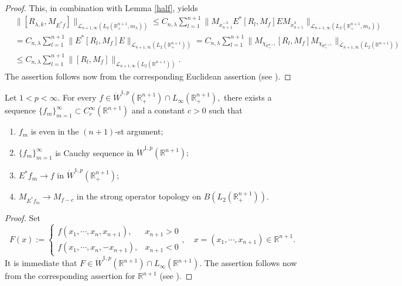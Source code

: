 \documentclass{amsart}
\begin{document}
\begin{proof}
This, in combination with Lemma \ref{half}, yields
\begin{align*}
&\|[R_{\lambda,k},M_{E^{\ast}f}]\|_{\mathcal{L}_{n+1,\infty}(L_2(\mathbb{R}^{n+1}_+,m_{\lambda}))}\leq C_{n,\lambda}\sum_{l=1}^{n+1}\Big\|M_{x_{n+1}^{-\lambda}} E^{\ast}[R_l,M_f]E M_{x_{n+1}^{\lambda}}\Big\|_{\mathcal{L}_{n+1,\infty}(L_2(\mathbb{R}^{n+1}_+,m_{\lambda}))}\\
&=C_{n,\lambda}\sum_{l=1}^{n+1}\Big\|E^{\ast}[R_l,M_f]E\Big\|_{\mathcal{L}_{n+1,\infty}(L_2(\mathbb{R}^{n+1}_+))}=C_{n,\lambda} \sum_{l=1}^{n+1}\Big\|M_{\chi_{\mathbb{R}_+^{n+1}}}[R_l,M_f]M_{\chi_{\mathbb{R}_+^{n+1}}}\Big\|_{\mathcal{L}_{n+1,\infty}(L_2(\mathbb{R}^{n+1}))}\\
&\leq C_{n,\lambda} \sum_{l=1}^{n+1}\Big\|[R_l,M_f]\Big\|_{\mathcal{L}_{n+1,\infty}(L_2(\mathbb{R}^{n+1}))}.
\end{align*}
The assertion follows now from the corresponding Euclidean assertion (see \cite[Theorem 1]{LMSZ}).
\end{proof}

\begin{lemma}\label{density lemma} Let $1<p<\infty.$ For every $f \in \dot{W}^{1,p}(\mathbb{R}_+^{n+1})\cap L_{\infty}(\mathbb{R}_+^{n+1}),$ there exists a sequence $\{f_m\}_{m=1}^\infty \subset C^{\infty}_c(\mathbb{R}^{n+1})$ and a constant $c>0$ such that
\begin{enumerate}[{\rm (i)}]
\item $f_m$ is even in the $(n+1)$-st argument;
\item $\{f_m\}_{m=1}^\infty$ is Cauchy sequence in $\dot{W}^{1,p}(\mathbb{R}^{n+1});$
\item $E^{\ast}f_m\to f$ in $\dot{W}^{1,p}(\mathbb{R}_+^{n+1});$
\item $M_{E^{\ast}f_m}\rightarrow M_{f-c}$ in the strong operator topology on $B(L_2(\mathbb{R}^{n+1}_+))$.
\end{enumerate}	
\end{lemma}
\begin{proof} Set
$$F(x):=
\begin{cases}
f(x_1,\cdots,x_n,x_{n+1}),& x_{n+1}>0\\
f(x_1,\cdots,x_n,-x_{n+1}),& x_{n+1}<0
\end{cases},\quad x=(x_1,\cdots,x_{n+1})\in\mathbb{R}^{n+1}.
$$
It is immediate that $F\in\dot{W}^{1,p}(\mathbb{R}^{n+1})\cap L_{\infty}(\mathbb{R}^{n+1}).$ The assertion follows now from the corresponding assertion for $\mathbb{R}^{n+1}$ (see \cite[Theorem 3]{LMSZ}).
\end{proof}
\end{document}
